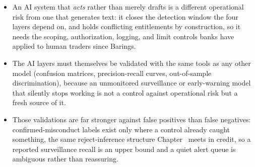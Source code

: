 \documentclass[../ai_in_finance]{subfiles}
\begin{document}
\begin{itemize}
\item An AI system that \emph{acts} rather than merely drafts is a different operational risk from one that generates text: it closes the detection window the four layers depend on, and holds conflicting entitlements by construction, so it needs the scoping, authorization, logging, and limit controls banks have applied to human traders since Barings.
\item The AI layers must themselves be validated with the same tools as any other model (confusion matrices, precision-recall curves, out-of-sample discrimination), because an unmonitored surveillance or early-warning model that silently stops working is not a control against operational risk but a fresh source of it.
\item Those validations are far stronger against false positives than false negatives: confirmed-misconduct labels exist only where a control already caught something, the same reject-inference structure Chapter~ meets in credit, so a reported surveillance recall is an upper bound and a quiet alert queue is ambiguous rather than reassuring.
\end{itemize}

\end{document}
